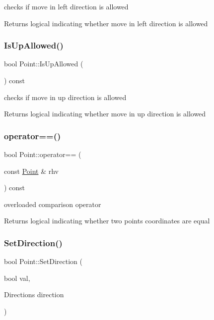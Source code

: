 checks if move in left direction is allowed 

\begin{DoxyReturn}{Returns}
logical indicating whether move in left direction is allowed 
\end{DoxyReturn}
\mbox{\label{class_point_af43939ed444048c105909fe20ec9d7a1}} 
\subsubsection{\texorpdfstring{Is\+Up\+Allowed()}{IsUpAllowed()}}
{\footnotesize\ttfamily bool Point\+::\+Is\+Up\+Allowed (\begin{DoxyParamCaption}{ }\end{DoxyParamCaption}) const}



checks if move in up direction is allowed 

\begin{DoxyReturn}{Returns}
logical indicating whether move in up direction is allowed 
\end{DoxyReturn}
\mbox{\label{class_point_a7cda0356e8cf4ca2daae36fe45273d77}} 
\subsubsection{\texorpdfstring{operator==()}{operator==()}}
{\footnotesize\ttfamily bool Point\+::operator== (\begin{DoxyParamCaption}\item[{const \mbox{\hyperlink{class_point}{Point}} \&}]{rhv }\end{DoxyParamCaption}) const}



overloaded comparison operator 

\begin{DoxyReturn}{Returns}
logical indicating whether two points coordinates are equal 
\end{DoxyReturn}
\mbox{\label{class_point_a30fe455d593e1f5e049bd80e374045a4}} 
\subsubsection{\texorpdfstring{Set\+Direction()}{SetDirection()}}
{\footnotesize\ttfamily bool Point\+::\+Set\+Direction (\begin{DoxyParamCaption}\item[{bool}]{val,  }\item[{Directions}]{direction }\end{DoxyParamCaption})}



